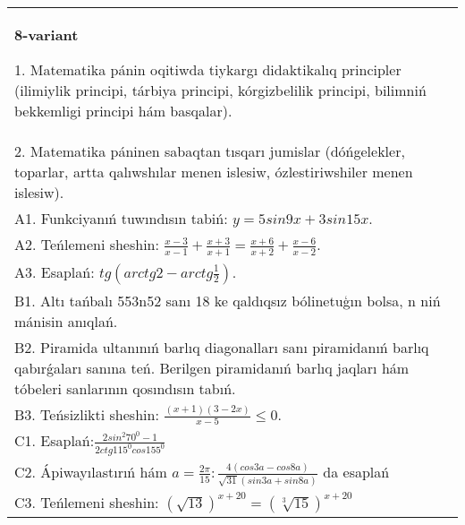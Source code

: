 \documentclass{article}
\begin{document}
\begin{tabular}{m{17cm}}
\textbf{8-variant}

1. Matematika pánin oqitiwda tiykargı didaktikalıq principler (ilimiylik principi, tárbiya principi, kórgizbelilik principi, bilimniń bekkemligi principi hám basqalar). \\
2. Matematika páninen sabaqtan tısqarı jumislar (dóńgelekler, toparlar, artta qalıwshılar menen islesiw, ózlestiriwshiler menen islesiw). \\
A1. Funkciyanıń tuwındısın tabiń: \(y = 5 sin 9x + 3 sin 15x\). \\
A2. Teńlemeni sheshin: \(\frac{x - 3}{x - 1} + \frac{x + 3}{x + 1} = \frac{x + 6}{x + 2} + \frac{x - 6}{x - 2}\). \\
A3. Esaplań: \(tg\left(arctg2 - arctg\frac{1}{2} \right) \). \\
B1. Altı tańbalı 553n52 sanı 18 ke qaldıqsız bólinetuģın bolsa, n niń mánisin anıqlań. \\
B2. Piramida ultanınıń barlıq diagonalları sanı piramidanıń barlıq qabırǵaları sanına teń. Berilgen piramidanıń barlıq jaqları hám tóbeleri sanlarının qosındısın tabıń. \\
B3. Teńsizlikti sheshin: \(\frac{ (x + 1) (3 - 2x) }{x - 5} \leq 0\). \\
C1. Esaplań:\(\frac{2sin^{2}70^{0} - 1}{2ctg115^{0}cos155^{0}}\) \\
C2. Ápiwayılastırıń hám \(a = \frac{2\pi}{15}:\frac{4 (cos3a - cos8a) }{\sqrt{31} (sin3a + sin8a) }\) da esaplań \\
C3. Teńlemeni sheshin: \((\sqrt{13}) ^{x + 20} = (\sqrt[3]{15}) ^{x + 20}\) \\

\end{tabular}
\vspace{1cm}
\end{document}
